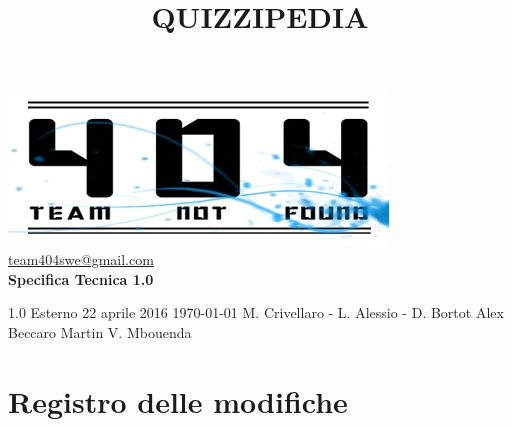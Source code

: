 \documentclass[a4paper,11pt]{article}
\title{\textbf{{\fontsize{8mm}{5mm}\selectfont QUIZZIPEDIA}}}
\date{}
\author{}
\begin{document}
	\maketitle
	\thispagestyle{empty}
	\begin{center}	
	\includegraphics{../team_not_found.jpg}\\
	\fontsize{5mm}{3mm}\url{team404swe@gmail.com}\\
	
	\vspace{50mm}
	\textbf{Specifica Tecnica 1.0}
	\end{center}
			{1.0} 							%
			{Esterno} 						%
			{22 aprile 2016} 				%
			{\today} 						%
			{M. Crivellaro - L. Alessio - D. Bortot}	%
			{Alex Beccaro } 			%
			{Martin V. Mbouenda} 				%
	\newpage
	\thispagestyle{empty}
	\null  

	\newpage
	\newpage
	\fancyfoot[R]{\thepage}
	
	\hspace{30 mm}
	\section*{Registro delle modifiche}
	
	\beginregistro
	
\end{document}
